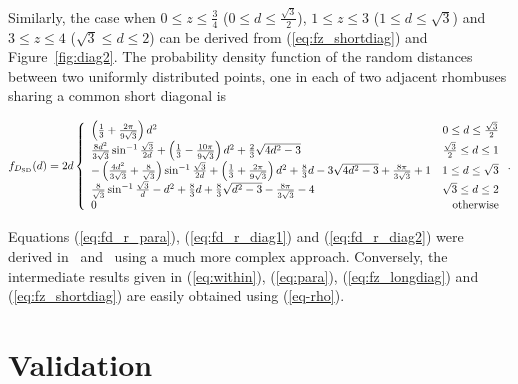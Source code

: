 \documentclass[12pt,draftclsnofoot,onecolumn]{IEEEtran}
\begin{document}
Similarly, the case when $0 \leq z \leq \frac{3}{4}$ ($0\leq d\leq
\frac{\sqrt{3}}{2}$), $1 \leq z \leq 3$ ($1\leq d\leq \sqrt{3}$) and
$3 \leq z \leq 4$ ($\sqrt{3}\leq d\leq 2$) can be derived from (\ref{eq:fz_shortdiag}) and Figure~\ref{fig:diag2}.
The probability density function of the random distances between two uniformly
distributed points, one in each of two adjacent rhombuses sharing a common
short diagonal is
\begin{small}
\begin{equation}\label{eq:fd_r_diag2}
  f_{D_{\rm SD}}(d)=2d\left\{
    \begin{array}{lr}

\left(\frac{1}{3}+\frac{2\pi}{9\sqrt{3}}\right)d^2 & 0\leq d\leq
\frac{\sqrt{3}}{2}\\

\frac{8d^2}{3\sqrt{3}}\sin^{-1}\frac{\sqrt{3}}{2d}+\left(\frac{1}{3}-\frac{10\pi
}{9\sqrt{3}}\right)d^2+\frac{2}{3}\sqrt{4d^2-3} & \frac{\sqrt{3}}{2} \leq d \leq
1\\

-\left(\frac{4d^2}{3\sqrt{3}}+\frac{8}{\sqrt{3}}\right)\sin^{-1}\frac{\sqrt{3}}{
2d}+\left(\frac{1}{3}+\frac{2\pi}{9\sqrt{3}}\right)d^2+\frac{8}{3}d-3\sqrt{
4d^2-3}+\frac{8\pi}{3\sqrt{3}}+1 & 1\leq d\leq \sqrt{3} \\

\frac{8}{\sqrt{3}}\sin^{-1}\frac{\sqrt{3}}{d}-d^2+\frac{8}{3}d+\frac{8}{3}\sqrt{
d^2-3}-\frac{8\pi}{3\sqrt{3}}-4 & \sqrt{3}\leq d\leq 2 \\

      0 & {\rm otherwise}
    \end{array}
  \right..
\end{equation}
\end{small}

Equations (\ref{eq:fd_r_para}), (\ref{eq:fd_r_diag1}) and
(\ref{eq:fd_r_diag2}) were derived in~\cite{zhuang2011random}
and~\cite{zhuang2012geometrical} using a much more complex approach.
Conversely, the intermediate results given in (\ref{eq:within}), (\ref{eq:para}),
(\ref{eq:fz_longdiag}) and (\ref{eq:fz_shortdiag}) are easily obtained using (\ref{eq-rho}).

\section{Validation}
\end{document}
